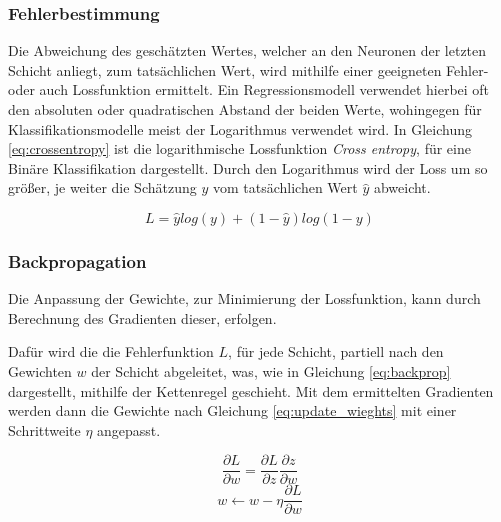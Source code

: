 \subsubsection{Fehlerbestimmung}
Die Abweichung des geschätzten Wertes, welcher an den
Neuronen der letzten Schicht anliegt, zum tatsächlichen Wert,
wird mithilfe einer geeigneten Fehler- oder auch Lossfunktion
ermittelt.
Ein Regressionsmodell verwendet hierbei oft 
den absoluten oder quadratischen Abstand der beiden 
Werte, wohingegen für Klassifikationsmodelle meist 
der Logarithmus verwendet wird.
In Gleichung \ref{eq:crossentropy} ist die logarithmische Lossfunktion
\textit{Cross entropy}, für eine Binäre Klassifikation 
dargestellt.
Durch den Logarithmus wird der Loss um so größer,
je weiter die Schätzung $y$ vom 
tatsächlichen Wert $\hat{y}$ abweicht.
\vspace{0.5cm}

\begin{equation}
    \label{eq:crossentropy}
    L = \hat{y}log(y) + (1 - \hat{y})log(1 - y)
\end{equation}
\vspace{0.5cm}


\subsubsection{Backpropagation}

Die Anpassung der Gewichte, zur Minimierung der Lossfunktion, 
kann durch Berechnung des Gradienten dieser, erfolgen.

Dafür wird die die Fehlerfunktion $L$, für jede Schicht, partiell
nach den Gewichten $w$ der Schicht abgeleitet,
was, wie in Gleichung \ref{eq:backprop}
dargestellt, mithilfe der Kettenregel geschieht.
Mit dem ermittelten Gradienten werden
dann die Gewichte nach Gleichung \ref{eq:update_wieghts}
mit einer Schrittweite $\eta$ angepasst.
\vspace{0.5cm}

\begin{equation}
    \label{eq:backprop}
    \frac{\partial L}{\partial w} = \frac{\partial L}{\partial z}\frac{\partial z}{\partial w}
\end{equation}
\vspace{0.5cm}
\begin{equation}
    \label{eq:update_wieghts}
    w  \leftarrow w - \eta \frac{\partial L}{\partial w}
\end{equation}
\vspace{1cm}




